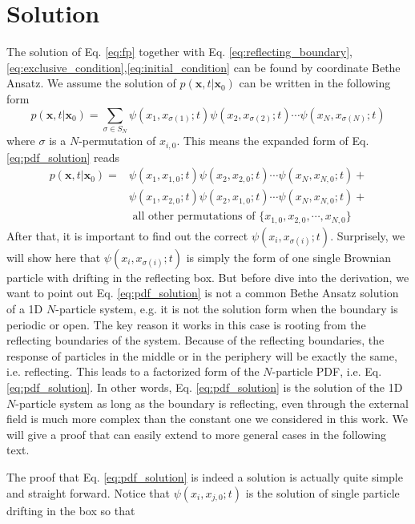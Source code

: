 \documentclass[12pt,a4paper]{article}
\begin{document}
\section{Solution}
\label{sec:solution}
The solution of Eq. \eqref{eq:fp} together with Eq.
\eqref{eq:reflecting_boundary},\eqref{eq:exclusive_condition},\eqref{eq:initial_condition}
can be found by coordinate Bethe Ansatz\cite{}.  We assume the solution of
$p(\mathbf{x}, t | \mathbf{x}_0)$ can be written in the following form
\begin{equation}
    \label{eq:pdf_solution}
    p(\mathbf{x}, t | \mathbf{x}_0) = \sum_{\sigma\in
        S_{N}}{\psi(x_1, x_{\sigma(1)};t)\psi(x_2, x_{\sigma(2)};t)\cdots\psi(x_N,
        x_{\sigma(N)};t)}
\end{equation}
where $\sigma$ is a $N$-permutation of $x_{i,0}$. This means the expanded form
of Eq. \eqref{eq:pdf_solution} reads
\begin{align*}
    \label{eq:pdf_solution_expanded}
    p(\mathbf{x}, t | \mathbf{x}_0) = &
    {\psi(x_1, x_{1,0};t)\psi(x_2, x_{2,0};t)\cdots\psi(x_N,x_{N,0};t)} + \\
    & {\psi(x_1, x_{2,0};t)\psi(x_2, x_{1,0};t)\cdots\psi(x_N,x_{N,0};t)} + \\
    & \text{ all other permutations of } \{x_{1,0}, x_{2,0}, \cdots, x_{N,0}\}
\end{align*}
After that, it is important to find out the correct $\psi(x_i,
x_{\sigma(i)};t)$.  Surprisely, we will show here that $\psi(x_i,
x_{\sigma(i)};t)$ is simply the form of one single Brownian particle with
drifting in the reflecting box. But before dive into the derivation, we want to
point out Eq. \eqref{eq:pdf_solution} is not a common Bethe Ansatz solution of a
1D $N$-particle system, e.g. it is not the solution form when the boundary is
periodic or open\cite{}. The key reason it works in this case is rooting from
the reflecting boundaries of the system. Because of the reflecting boundaries,
the response of particles in the middle or in the periphery will be exactly the
same, i.e. reflecting. This leads to a factorized form of the $N$-particle
PDF, i.e. Eq. \eqref{eq:pdf_solution}. In other words, Eq.
\eqref{eq:pdf_solution} is the solution of the 1D $N$-particle system as long as
the boundary is reflecting, even through the external field is much more complex
than the constant one we considered in this work. We will give a proof that can
easily extend to more general cases in the following text.

The proof that Eq. \eqref{eq:pdf_solution} is indeed a solution is actually
quite simple and straight forward. Notice that $\psi(x_i, x_{j,0};t)$ is the
solution of single particle drifting in the box so that
\end{document}

